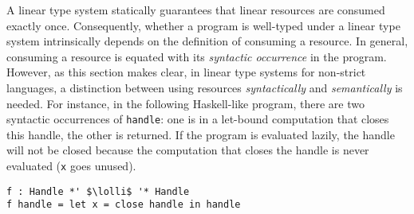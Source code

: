 \documentclass[acmsmall,review,anonymous,screen]{acmart}
\newcommand{\lolli}{\multimap}
\begin{document}
A linear type system statically guarantees that linear resources are
consumed exactly once. Consequently, whether a program is
well-typed under a linear type system intrinsically depends on the
definition of consuming a resource.
In general, consuming a resource is equated with its 
\emph{syntactic occurrence} in the program. However, as this section
makes clear, in linear type systems for non-strict
languages, a distinction between using
resources \emph{syntactically} and \emph{semantically} is needed.
%
For instance, in the following Haskell-like program, there are two syntactic
occurrences of \lstinline{handle}: one is in a let-bound computation that
closes this handle, the other is returned. If the program is evaluated lazily,
the handle will not be closed because the computation that closes the handle is
never evaluated (\lstinline{x} goes unused).
%
\begin{lstlisting}
f : Handle *' $\lolli$ '* Handle
f handle = let x = close handle in handle
\end{lstlisting}
%
%
%
%
%
%
%
%
%
%
\end{document}
